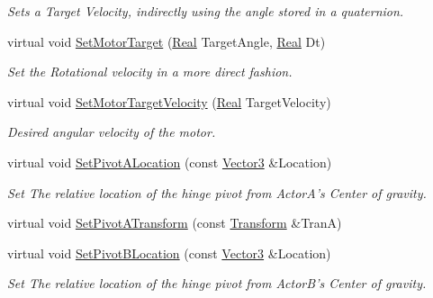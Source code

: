 \begin{DoxyCompactItemize}
\begin{DoxyCompactList}\small\item\em Sets a Target Velocity, indirectly using the angle stored in a quaternion. \item\end{DoxyCompactList}\item 
virtual void \hyperlink{classphys_1_1HingeConstraint_ac9eb6207043906b972c8ad897ead15df}{SetMotorTarget} (\hyperlink{namespacephys_af7eb897198d265b8e868f45240230d5f}{Real} TargetAngle, \hyperlink{namespacephys_af7eb897198d265b8e868f45240230d5f}{Real} Dt)
\begin{DoxyCompactList}\small\item\em Set the Rotational velocity in a more direct fashion. \item\end{DoxyCompactList}\item 
virtual void \hyperlink{classphys_1_1HingeConstraint_a38600eba1bb9406561437ec1e5f30a9b}{SetMotorTargetVelocity} (\hyperlink{namespacephys_af7eb897198d265b8e868f45240230d5f}{Real} TargetVelocity)
\begin{DoxyCompactList}\small\item\em Desired angular velocity of the motor. \item\end{DoxyCompactList}\item 
virtual void \hyperlink{classphys_1_1HingeConstraint_a6baadfc607e0d7c2167c9201bd4f8bdf}{SetPivotALocation} (const \hyperlink{classphys_1_1Vector3}{Vector3} \&Location)
\begin{DoxyCompactList}\small\item\em Set The relative location of the hinge pivot from ActorA's Center of gravity. \item\end{DoxyCompactList}\item 
virtual void \hyperlink{classphys_1_1HingeConstraint_af6fd3ac147683eecb2c98c60c58f386c}{SetPivotATransform} (const \hyperlink{classphys_1_1Transform}{Transform} \&TranA)
\item 
virtual void \hyperlink{classphys_1_1HingeConstraint_abaf055b50289aae35e7ea9f796677b18}{SetPivotBLocation} (const \hyperlink{classphys_1_1Vector3}{Vector3} \&Location)
\begin{DoxyCompactList}\small\item\em Set The relative location of the hinge pivot from ActorB's Center of gravity. \item\end{DoxyCompactList}\item 

\end{DoxyCompactItemize}
